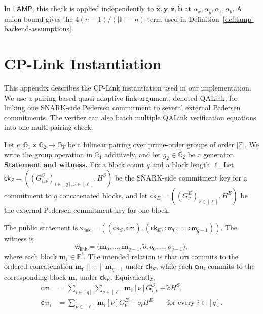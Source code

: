 \documentclass[conference,compsoc]{IEEEtran}
\newcommand{\cm}{\textsf{cm}}
\newcommand{\ck}{\textsf{ck}}
\newcommand{\vect}{\mathbf}         %
\renewcommand{\ck}{{\textsf{ck}}}
\newcommand{\stmt}{\mathsf{x}}      %
\newcommand{\wit}{\mathsf{w}}       %
\newcommand{\protocol}{\textsf{LAMP}}   %
\theoremstyle{plain}
\theoremstyle{definition}
\theoremstyle{remark}
\providecommand{\DIFaddtex}[1]{{\protect\color{DIFADD} \sf #1}} %
\providecommand{\DIFaddbegin}{} %
\providecommand{\DIFaddend}{} %
\providecommand{\DIFadd}[1]{\texorpdfstring{\DIFaddtex{#1}}{#1}} %
\providecommand{\DIFaddincludegraphics}[2][]{{\color{blue}\fbox{\DIFOincludegraphics[#1]{#2}}}} %
\DeclareRobustCommand{\DIFaddbegin}{\DIFOaddbegin \let\includegraphics\DIFaddincludegraphics} %
\DeclareRobustCommand{\DIFaddend}{\DIFOaddend \let\includegraphics\DIFOincludegraphics} %
\begin{document}
In \(\protocol\), this check is applied independently to
 \DIFaddbegin \DIFadd{\(\widehat{\vect{x}},\widehat{\vect{y}},\widehat{\vect{z}},
\widehat{\vect{b}}\) at
\(\alpha_x,\alpha_y,\alpha_z,\alpha_b\)}\DIFaddend .  A union bound gives the
 \DIFaddbegin \DIFadd{\(4(n-1)/(|\mathbb{F}|-n)\) }\DIFaddend term used in
Definition~\ref{def:lamp-backend-assumptions}.

\DIFaddbegin \iffalse
\DIFaddend \section{CP-Link Instantiation}
\label{app:cplink-instant}

This appendix describes the CP-Link instantiation used in our implementation.
We use a pairing-based quasi-adaptive link argument, denoted QALink, for
linking one SNARK-side Pedersen commitment to several external Pedersen
commitments.  The verifier can also batch multiple QALink verification
equations into one multi-pairing check.

Let \(e:\mathbb{G}_1\times\mathbb{G}_2\to\mathbb{G}_T\) be a bilinear pairing
over prime-order groups of order \(|\mathbb{F}|\).  We write the group
operation in \(\mathbb{G}_1\) additively, and let \(g_2\in\mathbb{G}_2\) be a
generator. \\

\noindent\textbf{Statement and witness.}
Fix a block count \(q\) and a block length \(\ell\).  Let
\(\ck_S=((G^S_{i,\nu})_{i\in[q],\nu\in[\ell]},H^S)\) be the SNARK-side
commitment key for a commitment to \(q\) concatenated blocks, and let
\(\ck_E=((G^E_{\nu})_{\nu\in[\ell]},H^E)\) be the external Pedersen commitment
key for one block.

The public statement is
\(\stmt_{\mathsf{link}}=((\ck_S,\widetilde{\cm}),
(\ck_E,\cm_0,\ldots,\cm_{q-1}))\).  The witness is
\[
  \wit_{\mathsf{link}}
  =
  \big(
    \vect{m}_0,\ldots,\vect{m}_{q-1},
    \widetilde{o},
    o_0,\ldots,o_{q-1}
  \big),
\]
where each block \(\vect{m}_i\in\mathbb{F}^{\ell}\).  The intended relation is
that \(\widetilde{\cm}\) commits to the ordered concatenation
\(\vect{m}_0\|\cdots\|\vect{m}_{q-1}\) under \(\ck_S\), while each
\(\cm_i\) commits to the corresponding block \(\vect{m}_i\) under \(\ck_E\).
Equivalently,
\[
\begin{aligned}
  \widetilde{\cm}
  &=
  \sum_{i\in[q]}\sum_{\nu\in[\ell]}
  \vect{m}_i[\nu]G^S_{i,\nu}
  +
  \widetilde{o}H^S, \\
  \cm_i
  &=
  \sum_{\nu\in[\ell]}
  \vect{m}_i[\nu]G^E_{\nu}
  +
  o_iH^E
  \qquad \text{for every } i\in[q].
\end{aligned}
\]
\end{document}
